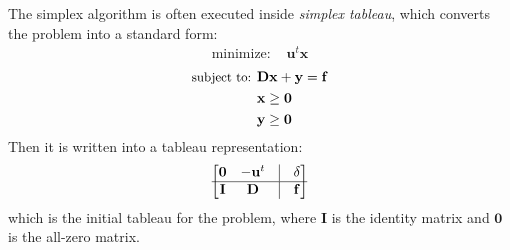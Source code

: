 \documentclass[letterpaper]{article}
\begin{document}
The simplex algorithm is often executed inside \emph{simplex tableau}, which converts the problem into a standard form:
\begin{align}
\textrm{minimize: } & \mathbf{u}^t\mathbf{x}
\end{align}
\vspace{-0.8cm}
\begin{align*}
\small
\textrm{subject to: } & \mathbf{D}\mathbf{x} + \mathbf{y} = \mathbf{f} \\
& \mathbf{x} \geq \mathbf{0} \\
& \mathbf{y} \geq \mathbf{0}
\end{align*}
Then it is written into a tableau representation:
\begin{equation}
\begin{bmatrix}
\mathbf{0} & -\mathbf{u}^t & \vline & \delta \\
\hline
\mathbf{I} & \mathbf{D} & \vline & \mathbf{f}
\end{bmatrix}
\end{equation}
which is the initial tableau for the problem, where $\mathbf{I}$ is the identity matrix and $\mathbf{0}$ is the all-zero matrix.

\end{document}

